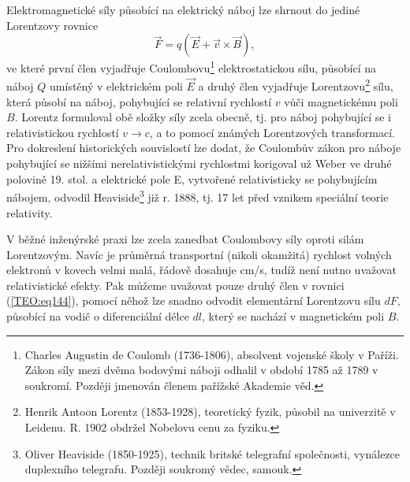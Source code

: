       Elektromagnetické síly působící na elektrický náboj lze shrnout do jediné Lorentzovy rovnice
      \begin{equation}\label{TEO:eq144}
        \vec{F}=q(\vec{E}+\vec{v}\times\vec{B}),
      \end{equation}
      ve které první člen vyjadřuje Coulombovu\footnote{Charles Augustin de Coulomb (1736-1806),
      absolvent vojenské školy v Paříži. Zákon síly mezi dvěma bodovými náboji odhalil v období 1785
      až 1789 v soukromí. Později jmenován členem pařížské Akademie věd.} elektrostatickou sílu,
      působící na náboj \(Q\) umístěný v elektrickém poli \(\vec{E}\) a druhý člen vyjadřuje
      Lorentzovu\footnote{Henrik Antoon Lorentz (1853-1928), teoretický fyzik, působil na univerzitě
      v Leidenu. R. 1902 obdržel Nobelovu cenu za fyziku.} sílu, která působí na náboj, pohybující
      se relativní rychlostí \(v\) vůči magnetickému poli \(B\). Lorentz formuloval obě složky síly
      zcela obecně, tj. pro náboj pohybující se i relativistickou rychlostí \(v \rightarrow c\), a
      to pomocí známých Lorentzových transformací. Pro dokreslení historických souvislostí lze
      dodat, že Coulombův zákon pro náboje pohybující se nižšími nerelativistickými rychlostmi
      korigoval už Weber ve druhé polovině 19. stol. a elektrické pole E, vytvořené relativisticky
      se pohybujícím nábojem, odvodil Heaviside\footnote{Oliver Heaviside (1850-1925), technik
      britské telegrafní společnosti, vynálezce duplexního telegrafu. Později soukromý vědec,
      samouk.} již r. 1888, tj. 17 let před vznikem speciální teorie relativity. 
      
      V běžné inženýrské praxi lze zcela zanedbat Coulombovy síly oproti silám Lorentzovým. Navíc je
      průměrná transportní (nikoli okamžitá) rychlost volných elektronů v kovech velmi malá, řádově
      dosahuje \unit{\cm/\s}, tudíž není nutno uvažovat relativistické efekty. Pak můžeme uvažovat
      pouze druhý člen v rovnici (\ref{TEO:eq144}), pomocí něhož lze snadno odvodit elementární
      Lorentzovu sílu \(dF\), působící na vodič o diferenciální délce \(dl\), který se nachází v
      magnetickém poli \(B\).
       
